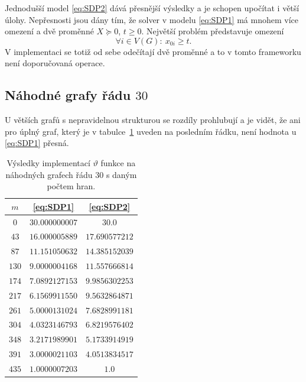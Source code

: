 Jednodušší model \ref{eq:SDP2} dává přesnější výsledky a je schopen upočítat i větší úlohy. Nepřesnosti jsou dány tím, že solver v modelu \ref{eq:SDP1} má mnohem více omezení a dvě proměnné $X \succeq 0$, $t \geq 0$. Největší problém představuje omezení
$$
    \forall i \in V(G):\ x_{0i} \geq t.
$$
V implementaci se totiž od sebe odečítají dvě proměnné a to v tomto frameworku není doporučovaná operace.
 

\subsection{Náhodné grafy řádu $30$}

U větších grafů s nepravidelnou strukturou se rozdíly prohlubují a je vidět, že ani pro úplný graf, který je v tabulce~\ref{tab:random_theta} uveden na posledním řádku, není hodnota u \ref{eq:SDP1} přesná.

\begin{table}[h!]
    \begin{center}
        \begin{tabular}{ c | c c }
        $m$    & \ref{eq:SDP1}  &  \ref{eq:SDP2}  \\
        \hline
        $0$    & $30.000000007$ &  $30.0$         \\
        $43$   & $16.000005889$ &  $17.690577212$ \\
        $87$   & $11.151050632$ &  $14.385152039$ \\
        $130$  & $9.0000004168$ &  $11.557666814$ \\
        $174$  & $7.0892127153$ &  $9.9856302253$ \\
        $217$  & $6.1569911550$ &  $9.5632864871$ \\
        $261$  & $5.0000131024$ &  $7.6828991181$ \\
        $304$  & $4.0323146793$ &  $6.8219576402$ \\
        $348$  & $3.2171989901$ &  $5.1733914919$ \\
        $391$  & $3.0000021103$ &  $4.0513834517$ \\
        $435$  & $1.0000007203$ &  $1.0$          \\
        \end{tabular}
    \end{center}
    \caption{Výsledky implementací $\vartheta$ funkce na náhodných grafech řádu $30$ s daným počtem hran.}
    \label{tab:random_theta}
\end{table}


